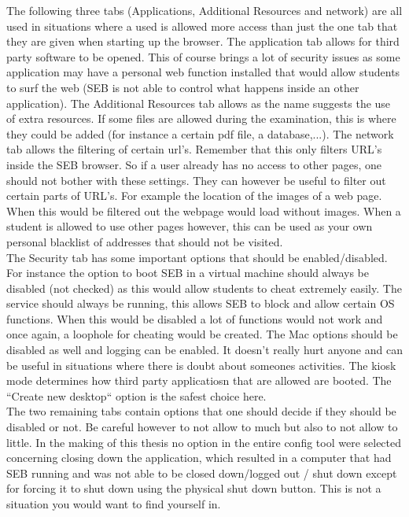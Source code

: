 The following three tabs (Applications, Additional Resources and network) are all used in situations where a used is allowed more access than just the one tab that they are given when starting up the browser. The application tab allows for third party software to be opened. This of course brings a lot of security issues as some application may have a personal web function installed that would allow students to surf the web (SEB is not able to control what happens inside an other application). The Additional Resources tab allows as the name suggests the use of extra resources. If some files are allowed during the examination, this is where they could be added (for instance a certain pdf file, a database,...). The network tab allows the filtering of certain url's. Remember that this only filters URL's inside the SEB browser. So if a user already has no access to other pages, one should not bother with these settings. They can however be useful to filter out certain parts of URL's. For example the location of the images of a web page. When this would be filtered out the webpage would load without images.
When a student is allowed to use other pages however, this can be used as your own personal blacklist of addresses that should not be visited.\\
The Security tab  has some important options that should be enabled/disabled. For instance the option to boot SEB in a virtual machine should always be disabled (not checked) as this would allow students to cheat extremely easily. The service should always be running, this allows SEB to block and allow certain OS functions. When this would be disabled a lot of functions would not work and once again, a loophole for cheating would be created. The Mac options should be disabled as well and logging can be enabled. It doesn't really hurt anyone and can be useful in situations where there is doubt about someones activities. The kiosk mode determines how third party applicatiosn that are allowed are booted. The ``Create new desktop`` option is  the safest choice here.\\
The two remaining tabs contain options that one should decide if they should be disabled or not. Be careful however to not allow to much but also to not allow to little. In the making of this thesis no option in the entire config tool were selected concerning closing down the application, which resulted in a computer that had SEB running and was not able to be closed down/logged out / shut down except for forcing it to shut down using the physical shut down button. This is not a situation you would want to find yourself in.\\

